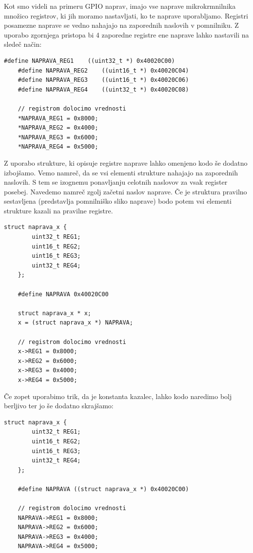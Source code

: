 \documentclass[12pt,letterpaper]{article}
\begin{document}
Kot smo videli na primeru GPIO naprav, imajo vse naprave mikrokrmnilnika množico registrov, ki jih moramo nastavljati, ko te naprave uporabljamo. Registri posamezne naprave se vedno nahajajo na zaporednih naslovih v pomnilniku. Z uporabo zgornjega pristopa bi 4 zaporedne registre ene naprave lahko nastavili na sledeč način:

\begin{center}
\begin{lstlisting}[style=CStyle]
    #define NAPRAVA_REG1	((uint32_t *) 0x40020C00)
    #define NAPRAVA_REG2	((uint16_t *) 0x40020C04)
    #define NAPRAVA_REG3	((uint16_t *) 0x40020C06)
    #define NAPRAVA_REG4	((uint32_t *) 0x40020C08)
    
    // registrom dolocimo vrednosti
    *NAPRAVA_REG1 = 0x8000;
    *NAPRAVA_REG2 = 0x4000;
    *NAPRAVA_REG3 = 0x6000;
    *NAPRAVA_REG4 = 0x5000;
\end{lstlisting}
\end{center}

Z uporabo strukture, ki opisuje registre naprave lahko omenjeno kodo še dodatno izbojšamo. Vemo namreč, da se vsi elementi strukture nahajajo na zaporednih naslovih. S tem se izognemu ponavljanju celotnih naslovov za vsak register posebej. Navedemo namreč zgolj začetni naslov naprave. Če je struktura pravilno sestavljena (predstavlja pomnilniško sliko naprave) bodo potem vsi elementi strukture kazali na pravilne registre.

\begin{center}
\begin{lstlisting}[style=CStyle]
    struct naprava_x {
    	uint32_t REG1;
    	uint16_t REG2;
    	uint16_t REG3;
    	uint32_t REG4;
    };
    
    #define	NAPRAVA 0x40020C00
    
    struct naprava_x * x;
    x = (struct naprava_x *) NAPRAVA;
    
    // registrom dolocimo vrednosti
    x->REG1 = 0x8000;
    x->REG2 = 0x6000;
    x->REG3 = 0x4000;
    x->REG4 = 0x5000;
\end{lstlisting}
\end{center}

Če zopet uporabimo trik, da je konstanta kazalec, lahko kodo naredimo bolj berljivo ter jo še dodatno skrajšamo:

\begin{center}
\begin{lstlisting}[style=CStyle]
    struct naprava_x {
    	uint32_t REG1;
    	uint16_t REG2;
    	uint16_t REG3;
    	uint32_t REG4;
    };
    
    #define	NAPRAVA ((struct naprava_x *) 0x40020C00)
    
    // registrom dolocimo vrednosti
    NAPRAVA->REG1 = 0x8000;
    NAPRAVA->REG2 = 0x6000;
    NAPRAVA->REG3 = 0x4000;
    NAPRAVA->REG4 = 0x5000;
\end{lstlisting}
\end{center}
\end{document}
